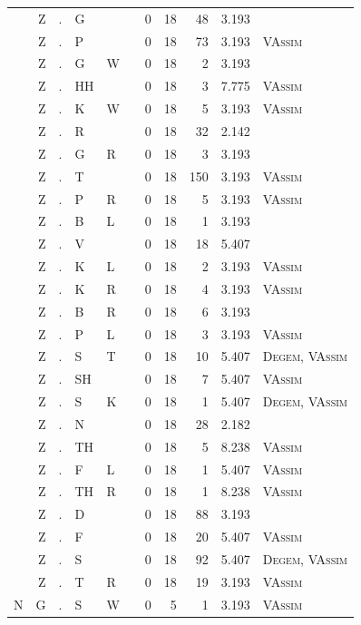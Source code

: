 \documentclass[12pt]{article}
\begin{document}
\begin{longtable}{r@{ } r@{ } c@{ } l@{ } l@{ } l@{ } r r r r l }
 & Z & . & G &  &  & 0 & 18 & 48 & 3.193 &  \\
 & Z & . & P &  &  & 0 & 18 & 73 & 3.193 & \textsc{VAssim} \\
 & Z & . & G & W &  & 0 & 18 & 2 & 3.193 &  \\
 & Z & . & HH &  &  & 0 & 18 & 3 & 7.775 & \textsc{VAssim} \\
 & Z & . & K & W &  & 0 & 18 & 5 & 3.193 & \textsc{VAssim} \\
 & Z & . & R &  &  & 0 & 18 & 32 & 2.142 &  \\
 & Z & . & G & R &  & 0 & 18 & 3 & 3.193 &  \\
 & Z & . & T &  &  & 0 & 18 & 150 & 3.193 & \textsc{VAssim} \\
 & Z & . & P & R &  & 0 & 18 & 5 & 3.193 & \textsc{VAssim} \\
 & Z & . & B & L &  & 0 & 18 & 1 & 3.193 &  \\
 & Z & . & V &  &  & 0 & 18 & 18 & 5.407 &  \\
 & Z & . & K & L &  & 0 & 18 & 2 & 3.193 & \textsc{VAssim} \\
 & Z & . & K & R &  & 0 & 18 & 4 & 3.193 & \textsc{VAssim} \\
 & Z & . & B & R &  & 0 & 18 & 6 & 3.193 &  \\
 & Z & . & P & L &  & 0 & 18 & 3 & 3.193 & \textsc{VAssim} \\
 & Z & . & S & T &  & 0 & 18 & 10 & 5.407 & \textsc{Degem}, \textsc{VAssim} \\
 & Z & . & SH &  &  & 0 & 18 & 7 & 5.407 & \textsc{VAssim} \\
 & Z & . & S & K &  & 0 & 18 & 1 & 5.407 & \textsc{Degem}, \textsc{VAssim} \\
 & Z & . & N &  &  & 0 & 18 & 28 & 2.182 &  \\
 & Z & . & TH &  &  & 0 & 18 & 5 & 8.238 & \textsc{VAssim} \\
 & Z & . & F & L &  & 0 & 18 & 1 & 5.407 & \textsc{VAssim} \\
 & Z & . & TH & R &  & 0 & 18 & 1 & 8.238 & \textsc{VAssim} \\
 & Z & . & D &  &  & 0 & 18 & 88 & 3.193 &  \\
 & Z & . & F &  &  & 0 & 18 & 20 & 5.407 & \textsc{VAssim} \\
 & Z & . & S &  &  & 0 & 18 & 92 & 5.407 & \textsc{Degem}, \textsc{VAssim} \\
 & Z & . & T & R &  & 0 & 18 & 19 & 3.193 & \textsc{VAssim} \\
N & G & . & S & W &  & 0 & 5 & 1 & 3.193 & \textsc{VAssim} \\

\end{longtable}
\end{document}
